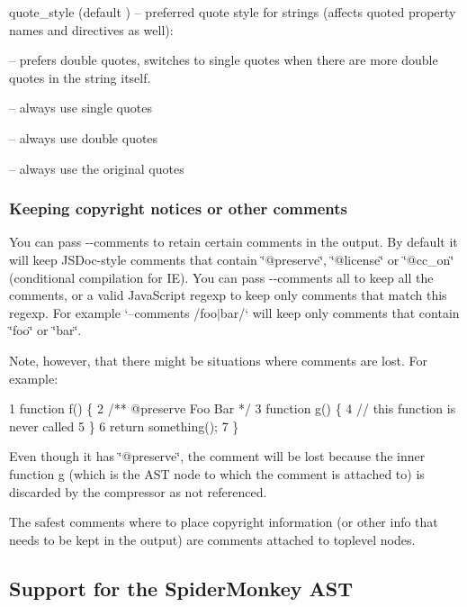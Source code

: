 \begin{DoxyItemize}
\item {\ttfamily quote\+\_\+style} (default {}) -- preferred quote style for strings (affects quoted property names and directives as well)\+:
\begin{DoxyItemize}
\item {} -- prefers double quotes, switches to single quotes when there are more double quotes in the string itself.
\item {} -- always use single quotes
\item {} -- always use double quotes
\item {} -- always use the original quotes
\end{DoxyItemize}
\end{DoxyItemize}

\subsubsection*{Keeping copyright notices or other comments}

You can pass {\ttfamily -\/-\/comments} to retain certain comments in the output. By default it will keep J\+S\+Doc-\/style comments that contain \char`\"{}@preserve\char`\"{}, \char`\"{}@license\char`\"{} or \char`\"{}@cc\+\_\+on\char`\"{} (conditional compilation for I\+E). You can pass {\ttfamily -\/-\/comments all} to keep all the comments, or a valid Java\+Script regexp to keep only comments that match this regexp. For example `--comments \textquotesingle{}/foo$\vert$bar/\textquotesingle{}` will keep only comments that contain \char`\"{}foo\char`\"{} or \char`\"{}bar\char`\"{}.

Note, however, that there might be situations where comments are lost. For example\+: 
\begin{DoxyCode}
1 function f() \{
2     /** @preserve Foo Bar */
3     function g() \{
4       // this function is never called
5     \}
6     return something();
7 \}
\end{DoxyCode}


Even though it has \char`\"{}@preserve\char`\"{}, the comment will be lost because the inner function {\ttfamily g} (which is the A\+S\+T node to which the comment is attached to) is discarded by the compressor as not referenced.

The safest comments where to place copyright information (or other info that needs to be kept in the output) are comments attached to toplevel nodes.

\subsection*{Support for the Spider\+Monkey A\+S\+T}

